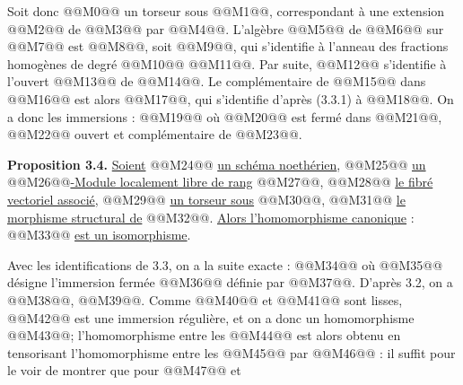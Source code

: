 
Soit donc @@M0@@ un torseur sous @@M1@@, correspondant à une extension @@M2@@ de @@M3@@ par @@M4@@. L'algèbre @@M5@@ de @@M6@@ sur @@M7@@ est @@M8@@, soit @@M9@@, qui s'identifie à l'anneau des fractions homogènes de degré @@M10@@ @@M11@@. Par suite, @@M12@@ s'identifie à l'ouvert @@M13@@ de @@M14@@. Le complémentaire de @@M15@@ dans @@M16@@ est alors @@M17@@, qui s'identifie d'après (3.3.1) à @@M18@@. On a donc les immersions :
@@M19@@
où @@M20@@ est fermé dans @@M21@@, @@M22@@ ouvert et complémentaire de @@M23@@.

\textbf{Proposition 3.4.} \uline{Soient} @@M24@@ \uline{un schéma noethérien}, @@M25@@ \uline{un} @@M26@@\uline{-Module localement libre de rang} @@M27@@, @@M28@@ \uline{le fibré vectoriel associé}, @@M29@@ \uline{un torseur sous} @@M30@@, @@M31@@ \uline{le morphisme structural de} @@M32@@. \uline{Alors l'homomorphisme canonique} :
@@M33@@
\uline{est un isomorphisme}.

Avec les identifications de 3.3, on a la suite exacte :
@@M34@@
où @@M35@@ désigne l'immersion fermée @@M36@@ définie par @@M37@@. D'après 3.2, on a @@M38@@, @@M39@@.
Comme @@M40@@ et @@M41@@ sont lisses, @@M42@@ est une immersion régulière, et on a donc un homomorphisme @@M43@@; l'homomorphisme entre les @@M44@@ est alors obtenu en tensorisant l'homomorphisme entre les @@M45@@ par @@M46@@ : il suffit pour le voir de montrer que pour @@M47@@ et
